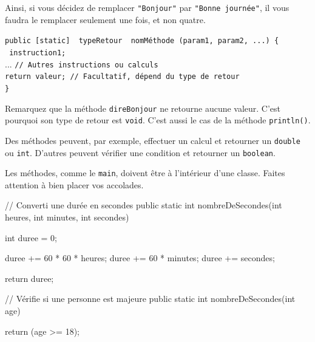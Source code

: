 \documentclass[12pt]{report}
\begin{document}
Ainsi, si vous décidez de remplacer \texttt{"Bonjour"} par \texttt{"Bonne journée"}, il vous faudra le remplacer seulement une fois, et non quatre.

\begin{tcolorbox}[enhanced,colframe=ultRed,
	title={Déclarer une méthode},
	sharp corners=south,
	boxsep = 1.5mm]
\texttt{public [static] {\color{ultRed} typeRetour} {\color[RGB]{12, 190, 12} nomMéthode} ({\color[RGB]{63, 136, 197}param1}, {\color[RGB]{63, 136, 197}param2}, ...) \{}\\[2pt]
	\hspace*{0.5cm} \texttt{{\color[RGB]{63, 136, 197} instruction1};}\\
	\hspace*{0.5cm} ... \texttt{// Autres instructions ou calculs}\\
	\hspace*{0.5cm} \texttt{{\color{ultRed}return} {\color[RGB]{255, 34, 12}valeur}; // Facultatif, dépend du type de retour}\\[2pt]
	\texttt{\}}
\end{tcolorbox}

Remarquez que la méthode \texttt{direBonjour} ne retourne aucune valeur. C'est pourquoi son type de retour est \texttt{void}. C'est aussi le cas de la méthode \texttt{println()}.

Des méthodes peuvent, par exemple, effectuer un calcul et retourner un \texttt{double} ou \texttt{int}. D'autres peuvent vérifier une condition et retourner un \texttt{boolean}.

Les méthodes, comme le \texttt{main}, doivent être à l'intérieur d'une classe. Faites attention à bien placer vos accolades.

\begin{code}
// Converti une durée en secondes
public static int nombreDeSecondes(int heures, int minutes, int secondes) {
	
	int duree = 0;
	
	duree += 60 * 60 * heures;
	duree += 60 * minutes;
	duree += secondes;
	
	return duree;	
	
}
\end{code}

\begin{code}
// Vérifie si une personne est majeure
public static int nombreDeSecondes(int age) {
	
	return (age >= 18);
	
}
\end{code}
\end{document}
